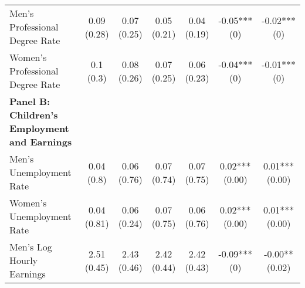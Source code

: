 \begin{landscape}
\begin{ThreePartTable}
\begin{longtable}[t]{>{\raggedright\arraybackslash}p{5cm}cccccc}
\hspace{1em}Men’s Professional Degree Rate & \specialcell{0.09\\(0.28)} & \specialcell{0.07\\(0.25)} & \specialcell{0.05\\(0.21)} & \specialcell{0.04\\(0.19)} & \specialcell{-0.05***\\(0)} & \specialcell{-0.02***\\(0)}\\
\addlinespace
\hspace{1em}Women’s Professional Degree Rate & \specialcell{0.1\\(0.3)} & \specialcell{0.08\\(0.26)} & \specialcell{0.07\\(0.25)} & \specialcell{0.06\\(0.23)} & \specialcell{-0.04***\\(0)} & \specialcell{-0.01***\\(0)}\\
\textbf{Panel B: Children's Employment and Earnings} & \textbf{} & \textbf{} & \textbf{} & \textbf{} & \textbf{} & \textbf{}\\
\hspace{1em}Men’s Unemployment Rate & \specialcell{0.04\\(0.8)} & \specialcell{0.06\\(0.76)} & \specialcell{0.07\\(0.74)} & \specialcell{0.07\\(0.75)} & \specialcell{0.02***\\(0.00)} & \specialcell{0.01***\\(0.00)}\\
\hspace{1em}Women’s Unemployment Rate & \specialcell{0.04\\(0.81)} & \specialcell{0.06\\(0.24)} & \specialcell{0.07\\(0.75)} & \specialcell{0.06\\(0.76)} & \specialcell{0.02***\\(0.00)} & \specialcell{0.01***\\(0.00)}\\
\hspace{1em}Men’s Log Hourly Earnings & \specialcell{2.51\\(0.45)} & \specialcell{2.43\\(0.46)} & \specialcell{2.42\\(0.44)} & \specialcell{2.42\\(0.43)} & \specialcell{-0.09***\\(0)} & \specialcell{-0.00**\\(0.02)}\\

\end{longtable}
\end{ThreePartTable}
\end{landscape}
